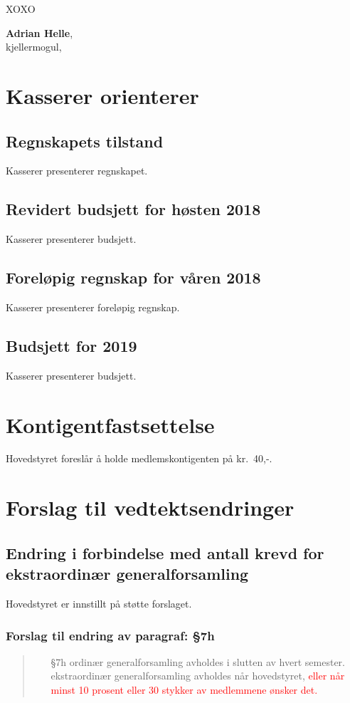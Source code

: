 \documentclass[10pt,norsk,a4paper]{article}
\begin{document}
XOXO

\textbf{Adrian Helle}, \\
kjellermogul, \date{14.\ november 2018}



\section{Kasserer orienterer}
\subsection{Regnskapets tilstand}
Kasserer presenterer regnskapet.

\subsection{Revidert budsjett for høsten 2018}
Kasserer presenterer budsjett.

\subsection{Foreløpig regnskap for våren 2018}
Kasserer presenterer foreløpig regnskap.

\subsection{Budsjett for 2019}
Kasserer presenterer budsjett.

\section{Kontigentfastsettelse}
Hovedstyret foreslår å holde medlemskontigenten på kr.~40,-.

\newpage

\section{Forslag til vedtektsendringer}

\subsection{Endring i forbindelse med antall krevd for ekstraordinær generalforsamling}

Hovedstyret er innstillt på støtte forslaget.

\subsubsection{Forslag til endring av paragraf: §7h}
\begin{quote}
	\begin{enumerate}
		\item[§7h]
            ordinær generalforsamling avholdes i slutten av hvert semester.
            ekstraordinær generalforsamling avholdes når hovedstyret,
            \textcolor{red}{eller når minst 10 prosent eller 30 stykker av medlemmene ønsker det.}
	\end{enumerate}
\end{quote}
\end{document}
